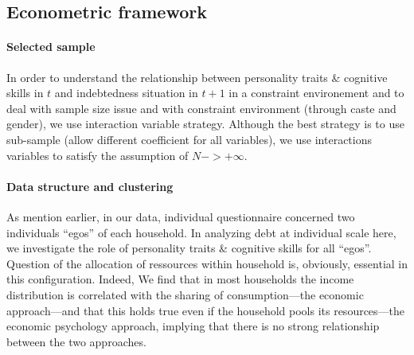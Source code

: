\documentclass[a4paper, 11pt, onecolumn]{article}
\begin{document}
	\subsection{Econometric framework}






\paragraph{Selected sample}

In order to understand the relationship between personality traits \& cognitive skills in $t$ and indebtedness situation in $t+1$ in a constraint environement and to deal with sample size issue and with constraint environment (through caste and gender), we use interaction variable strategy.
Although the best strategy is to use sub-sample (allow different coefficient for all variables), we use interactions variables to satisfy the assumption of $N->+\infty$.


\paragraph{Data structure and clustering}
As mention earlier, in our data, individual questionnaire concerned two individuals ``egos'' of each household.
In analyzing debt at individual scale here, we investigate the role of personality traits \& cognitive skills for all ``egos''.
Question of the allocation of ressources within household is, obviously, essential in this configuration.
Indeed, \citep{Lazear1988}
\citep{Bonke2015} We find that in most households the income distribution is correlated with the sharing of consumption—the economic approach—and that this holds true even if the household pools its resources—the economic psychology approach, implying that there is no strong relationship between the two approaches.
\end{document}
